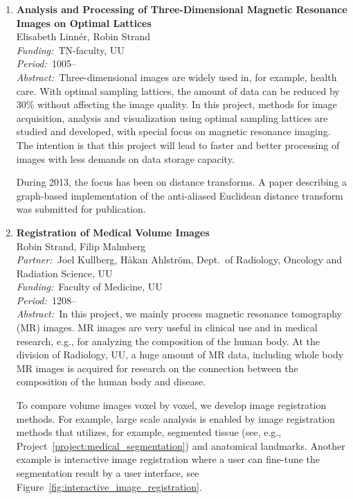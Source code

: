 \documentclass[10pt, a4paper]{article}
\newcommand{\aabstract}[1]{\emph{Abstract:~}#1}
\newcommand{\ffunding}[1]{\emph{Funding:~}#1\\}
\newcommand{\ppartner}[1]{\emph{Partner:~}#1\\}
\newcommand{\pperiod}[1]{\emph{Period:~}#1\\}
\begin{document}
\begin{enumerate}
\newpage
\item 
\label{proj:MRI_optimal_lattices}
\textbf{Analysis and Processing of Three-Dimensional Magnetic Resonance Images on Optimal Lattices} \\
Elisabeth Linn\'{e}r, Robin Strand\\
\ffunding{TN-faculty, UU}
\pperiod{1005--}
\aabstract{Three-dimensional images are widely used in, for example, health care. With optimal sampling lattices, the amount of data can be reduced by 30\% without affecting the image quality. In this project, methods for image acquisition, analysis and visualization using optimal sampling lattices are studied and developed, with special focus on magnetic resonance imaging. The intention is that this project will lead to faster and better processing of images with less demands on data storage capacity.

During 2013, the focus has been on distance transforms. A paper describing a graph-based implementation of the anti-aliased Euclidean distance transform was submitted for publication.}


\item 
\label{proj:MRI_registration}
\textbf{Registration of Medical Volume Images}\\
Robin Strand, Filip Malmberg\\
\ppartner{Joel Kullberg, H{\aa}kan Ahlstr\"{o}m, Dept.~of Radiology, Oncology and Radiation Science, UU}
\ffunding{Faculty of Medicine, UU}
\pperiod{1208--}
\aabstract{In this project, we mainly process magnetic resonance tomography (MR) images. MR images are very useful in clinical use and in medical research, e.g., for analyzing the composition of the human body. At the division of Radiology, UU, a huge amount of MR data, including whole body MR images is acquired for research on the connection between the composition of the human body and disease.

To compare volume images voxel by voxel, we develop image registration methods. For example, large scale analysis is enabled by image registration methods that utilizes, for example, segmented tissue (see, e.g., Project~\ref{project:medical_segmentation}) and anatomical landmarks. Another example is interactive image registration where a user can fine-tune the segmentation result by a user interface, see Figure~\ref{fig:interactive_image_registration}.}


\end{enumerate}
\end{document}
